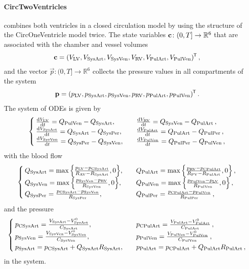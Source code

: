 \paragraph{CircTwoVentricles} combines both ventricles in a closed circulation model by using the structure of the CircOneVentricle model twice.
The state variables $\c\colon(0,T]\rightarrow\mathbb{R}^{6}$ that are associated with the chamber and vessel volumes
\begin{equation}
    \c = (\vol{LV}, \vol{SysArt}, \vol{SysVen}, \vol{RV}, \vol{PulArt}, \vol{PulVen})^\tran \,, \label{eq:lv:circ2a}
\end{equation}
and the vector $\vec p\colon(0,T]\rightarrow\mathbb{R}^{6}$ collects the pressure values in all compartments of the system
\begin{equation}
    \vec p = (\p{LV}, \p{SysArt}, \p{SysVen}, \p{RV}, \p{PulArt}, \p{PulVen})^\tran \,.
\end{equation}
The system of ODEs is given by
\begin{equation}
\begin{cases}
    \dv{\vol{LV}}{t} = \Q{PulVen} - \Q{SysArt} \qc & \dv{\vol{RV}}{t} = \Q{SysVen} - \Q{PulArt} \,, \\
    \dv{\vol{SysArt}}{t} = \Q{SysArt} - \Q{SysPer} \qc & \dv{\vol{PulArt}}{t} = \Q{PulArt} - \Q{PulPer} \,, \\
    \dv{\vol{SysVen}}{t} = \Q{SysPer} - \Q{SysVen} \qc & \dv{\vol{PulVen}}{t} = \Q{PulPer} - \Q{PulVen} \,,
\end{cases}
\end{equation}
with the blood flow 
\begin{equation}
\begin{cases}
    \Q{SysArt} = \max \qty{ \frac{\p{LV}-\p{CSysArt}}{R_\text{AV}-R_\text{SysArt}}, 0} \qc & 
    \Q{PulArt} = \max \qty{ \frac{\p{RV}-\p{CPulArt}}{R_\text{PV}-R_\text{PulArt}}, 0} \,, \\
    \Q{SysVen} = \max \qty{\frac{\p{SysVen} - \p{RV}}{R_\text{SysVen}}  ,0} \qc &
    \Q{PulVen} = \max \qty{\frac{\p{PulVen} - \p{LV}}{R_\text{PulVen}}  ,0} \,, \\
    \Q{SysPer} = \frac{\p{CSysArt} - \p{SysVen}}{R_\text{SysPer}} \qc &
    \Q{PulPer} = \frac{\p{CPulArt} - \p{PulVen}}{R_\text{PulPer}} \,, 
\end{cases}
\end{equation}
and the pressure
\begin{equation}
\begin{cases}
    \p{CSysArt} = \frac{\vol{SysArt}-\vol{SysArt}^0}{C_\mathrm{SysArt}} \qc &
    \p{CPulArt} = \frac{\vol{PulArt}-\vol{PulArt}^0}{C_\mathrm{PulArt}} \,, \\
    \p{SysVen} = \frac{\vol{SysVen} - \vol{SysVen}^0}{C_\mathrm{SysVen}} \qc &
    \p{PulVen} = \frac{\vol{PulVen} - \vol{PulVen}^0}{C_\mathrm{PulVen}} \,, \\
    \p{SysArt} = \p{CSysArt} + \Q{SysArt} R_\text{SysArt} \qc & 
    \p{PulArt} = \p{CPulArt} + \Q{PulArt} R_\text{PulArt} \,,
\end{cases}
\end{equation}
in the system.

